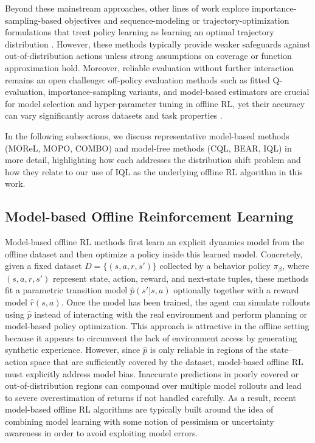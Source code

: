 \documentclass[master,english,final]{kaist-ucs}
\begin{document}
Beyond these mainstream approaches, other lines of work explore importance-sampling-based objectives and sequence-modeling or trajectory-optimization formulations that treat policy learning as learning an optimal trajectory distribution \cite{zhang2020gendice, nachum2019dualdice, chen2021decision, janner2021offline}. However, these methods typically provide weaker safeguards against out-of-distribution actions unless strong assumptions on coverage or function approximation hold. Moreover, reliable evaluation without further interaction remains an open challenge: off-policy evaluation methods such as fitted Q-evaluation, importance-sampling variants, and model-based estimators are crucial for model selection and hyper-parameter tuning in offline RL, yet their accuracy can vary significantly across datasets and task properties \cite{levine2020offline}.

In the following subsections, we discuss representative model-based methods (MOReL\cite{kidambi2020morel}, MOPO\cite{yu2020mopo}, COMBO\cite{yu2021combo}) and model-free methods (CQL\cite{kumar2020conservative}, BEAR\cite{kumar2019stabilizing}, IQL\cite{kostrikov2021offline}) in more detail, highlighting how each addresses the distribution shift problem and how they relate to our use of IQL\cite{kostrikov2021offline} as the underlying offline RL algorithm in this work.

\subsection{Model-based Offline Reinforcement Learning}
Model-based offline RL methods first learn an explicit dynamics model from the offline dataset and then optimize a policy inside this learned model. Concretely, given a fixed dataset 
$D=\{(s,a,r,s')\}$ collected by a behavior policy $\pi_\beta$, where $(s,a,r,s')$ represent state, action, reward, and next-state tuples, these methods fit a parametric transition model $\hat{p}(s' |s,a)$ optionally together with a reward model $\hat{r}(s,a)$. Once the model has been trained, the agent can simulate rollouts using $\hat{p}$ instead of interacting with the real environment and perform planning or model-based policy optimization. This approach is attractive in the offline setting because it appears to circumvent the lack of environment access by generating synthetic experience. However, since $\hat{p}$ is only reliable in regions of the state–action space that are sufficiently covered by the dataset, model-based offline RL must explicitly address model bias. Inaccurate predictions in poorly covered or out-of-distribution regions can compound over multiple model rollouts and lead to severe overestimation of returns if not handled carefully. As a result, recent model-based offline RL algorithms are typically built around the idea of combining model learning with some notion of pessimism or uncertainty awareness in order to avoid exploiting model errors.
\end{document}
